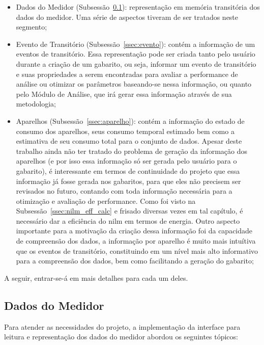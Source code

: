 \begin{itemize}
\item Dados do Medidor (Subsessão~\ref{ssec:dados_medidor}):
representação em memória transitória dos dados do medidor. Uma série
de aspectos tiveram de ser tratados neste segmento;
\item Evento de Transitório (Subsessão~\ref{ssec:evento}): contém a informação de um
eventos de transitório. Essa representação pode ser criada tanto pelo
usuário durante a criação de um gabarito, ou seja, informar um evento
de transitório e suas propriedades a serem encontradas para avaliar a
performance de análise ou otimizar os parâmetros baseando-se nessa
informação, ou quanto pelo Módulo de Análise, que irá gerar essa
informação através de sua metodologia;
\item Aparelhos (Subsessão~\ref{ssec:aparelho}): contém a informação
do estado de consumo dos aparelhos, seus consumo temporal estimado bem
como a estimativa de seu consumo total para o conjunto de dados.
Apesar deste trabalho ainda não ter tratado do problema de geração da
informação dos aparelhos (e por isso essa informação só ser gerada
pelo usuário para o gabarito), é interessante em termos de
continuidade do projeto que essa informação já fosse gerada nos
gabaritos, para que eles não precisem ser revisados no futuro,
contando com toda informação necessária para a otimização e avaliação
de performance. Como foi visto na Subsessão~\ref{ssec:nilm_eff_calc} e
frisado diversas vezes em tal capítulo, é necessário dar a eficiência
do \gls{nilm} em termos de energia. Outro aspecto importante para a
motivação da criação dessa informação foi da capacidade de compreensão
dos dados, a informação por aparelho é muito mais intuítiva que os
eventos de transitório, constituindo em um nível mais alto informativo
para a compreensão dos dados, bem como facilitando a geração do
gabarito;
\end{itemize}

A seguir, entrar-se-á em mais detalhes para cada um deles.

\subsection{Dados do Medidor}
\label{ssec:dados_medidor}

Para atender as necessidades do projeto, a implementação da interface
para leitura e representação dos dados do medidor abordou os seguintes
tópicos:

